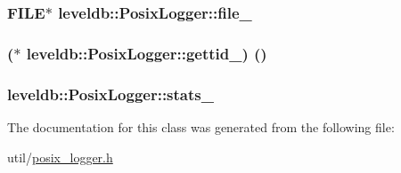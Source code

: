 \subsubsection[{file\+\_\+}]{\setlength{\rightskip}{0pt plus 5cm}F\+I\+L\+E$\ast$ leveldb\+::\+Posix\+Logger\+::file\+\_\+\hspace{0.3cm}{\ttfamily [private]}}\label{classleveldb_1_1_posix_logger_a7aee075e8c3eff4d15e1eb76fc111dbe}
\hypertarget{classleveldb_1_1_posix_logger_a50c5c46df09588931da4d640eb30d5d7}{}
\subsubsection[{gettid\+\_\+}]{($\ast$ leveldb\+::\+Posix\+Logger\+::gettid\+\_\+) ()\hspace{0.3cm}{\ttfamily [private]}}\label{classleveldb_1_1_posix_logger_a50c5c46df09588931da4d640eb30d5d7}
\hypertarget{classleveldb_1_1_posix_logger_a6a2acfa406445a2713dce8a0b1db8424}{}
\subsubsection[{stats\+\_\+}]{ leveldb\+::\+Posix\+Logger\+::stats\+\_\+}\label{classleveldb_1_1_posix_logger_a6a2acfa406445a2713dce8a0b1db8424}


The documentation for this class was generated from the following file\+:\begin{DoxyCompactItemize}
\item 
util/\hyperlink{posix__logger_8h}{posix\+\_\+logger.\+h}\end{DoxyCompactItemize}
